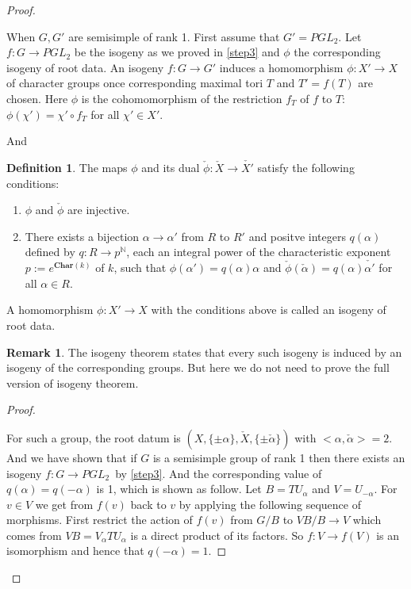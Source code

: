 \documentclass[12pt,a4paper,english]{article}
\theoremstyle{plain}
\theoremstyle{definition}
\newtheorem{defi}[thm]{Definition}
\newtheorem*{rem}{Remark}
\begin{document}
\begin{proof}
\begin{enumerate}
    When $G, G'$ are semisimple of rank 1. First assume that $G'=PGL_{2}$. Let $f:G\rightarrow PGL_{2}$ be the isogeny as we proved in \ref{step3} and $\phi$ the corresponding isogeny of root data. An isogeny $f:G\rightarrow G'$ induces a homomorphism $\phi:X'\rightarrow X$ of character groups once corresponding maximal tori $T$ and $T'=f(T)$ are chosen. Here $\phi$ is the cohomomorphism of the restriction $f_{T}$ of $f$ to $T$: $\phi(\chi')=\chi'\circ f_{T}$ for all $\chi'\in X'$. 
    
    And 
    \begin{defi}
    
The maps $\phi$ and its dual $\check{\phi}: \check{X}\rightarrow\check{X'}$ satisfy the following conditions:
    \begin{enumerate}
        \item $\phi$ and $\check{\phi}$ are injective.
        \item There exists a bijection $\alpha\rightarrow \alpha'$ from $R$ to $R'$ and positve integers $q(\alpha)$ defined by $q: R\rightarrow p^{\mathbb{N}}$, each an integral power of the characteristic exponent $p:= e^{\textbf{Char}(k)}$ of $k$, such that $\phi(\alpha')=q(\alpha)\alpha$ and $\check{\phi}(\check{\alpha})=q(\alpha)\check{\alpha'}$ for all $\alpha\in R$.
        
    \end{enumerate}
A homomorphism $\phi:X'\rightarrow X$ with the conditions above is called an isogeny of root data. 
    \end{defi}
    \begin{rem}
    The isogeny theorem states that every such isogeny is induced by an isogeny of the corresponding groups. But here we do not need to prove the full version of isogeny theorem. 
    \end{rem}
   
\end{enumerate}
\begin{proof}\label{proofisogeny}

For such a group, the root datum is $(X,\{\pm\alpha\},\check{X},\{\pm\check{\alpha}\})$ with $<\alpha,\check{\alpha}>=2$. And we have shown that if $G$ is a semisimple group of rank 1 then there exists an isogeny $f:G\rightarrow PGL_{2}$\ by \ref{step3}. And the corresponding value of $q(\alpha)=q(-\alpha)$ is 1, which is shown as follow. Let $B=TU_{\alpha}$ and $V=U_{-\alpha}$. For $v\in V$ we get from $f(v)$ back to $v$ by applying the following sequence of morphisms. First restrict the action of $f(v)$ from $G/B$ to $VB/B\rightarrow V$ which comes from $VB=V_{\alpha}TU_{\alpha}$ is a direct product of its factors. So $f:V\rightarrow f(V)$ is an isomorphism and hence that $q(-\alpha)=1$.


\end{proof}
\end{proof}
\end{document}
